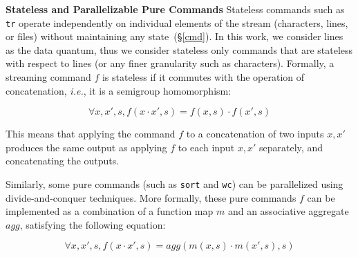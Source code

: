 \documentclass[sigplan, review, screen, anonymous]{acmart}
\newcommand{\ie}{{\em i.e.}, }
\newcommand{\heading}[1]{\vspace{4pt}\noindent\textbf{#1}\enspace}
\newcommand{\ttt}[1]{\texttt{#1}}
\newcommand{\kk}[1]{[{\color{magenta}kk: #1}]}
\newcommand{\km}[1]{[{\color{blue}km: #1}]}
\newcommand{\sx}[1]{(\S\ref{#1})}
\begin{document}

\heading{Stateless and Parallelizable Pure Commands}
Stateless commands such as \ttt{tr}
operate independently on individual elements of the stream
(characters, lines, or files) without maintaining any state~\sx{cmd}. In this
work, we consider lines as the data quantum, thus we consider stateless only commands that are
stateless with respect to lines (or any finer granularity such as
characters). Formally, a streaming command $f$ is stateless if it commutes with
the operation of concatenation, \ie it is a semigroup homomorphism:

\[
\forall x, x', s, f(x \cdot x', s) = f(x, s) \cdot f(x', s)
\]


\noindent
This means that applying the command $f$ to a concatenation of two
inputs $x, x'$ produces the same output as applying $f$ to each input
$x, x'$ separately, and concatenating the outputs.

Similarly, some pure commands (such as \ttt{sort} and \ttt{wc}) can be
parallelized using divide-and-conquer techniques. More formally, these
pure commands $f$ can be implemented as a combination of a function map
$m$ and an associative aggregate $agg$, satisfying the following equation:

\[
\forall x, x', s, f(x \cdot x', s) = agg(m(x, s) \cdot m(x', s), s)
\]
\end{document}
